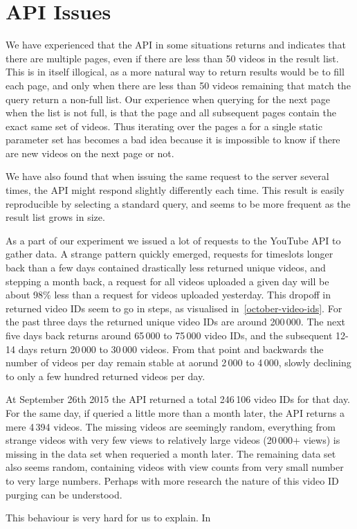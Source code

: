 \section{API Issues}
We have experienced that the API in some situations returns and indicates that
there are multiple pages, even if there are less than 50 videos in the result
list. This is in itself illogical, as a more natural way to return results would
be to fill each page, and only when there are less than 50 videos remaining that
match the query return a non-full list. Our experience when querying for the next
page when the list is not full, is that the page and all subsequent pages contain
the exact same set of videos. Thus iterating over the pages a  for a single
static parameter set has becomes a bad idea because it is impossible to know if
there are new videos on the next page or not.  %

We have also found that when issuing the same request to the server several
times, the API might respond slightly differently each time. This result is
easily reproducible by selecting a standard query, and seems to be more
frequent as the result list grows in size. %

As a part of our experiment we issued a lot of requests to the YouTube API to
gather data. A strange pattern quickly emerged, requests for timeslots longer
back than a few days contained drastically less returned unique videos, and 
stepping a month back, a request for all videos uploaded a given day will be 
about 98\% less than a request for videos uploaded yesterday. This dropoff in
returned video IDs seem to go in steps, as visualised
in~\cref{october-video-ids}. For the past three days the returned unique video
IDs are around 200\,000. The next five days back returns around 65\,000 to 75\,000
video IDs, and the subsequent 12-14 days return 20\,000 to 30\,000 videos. From
that point and backwards the number of videos per day remain stable at aorund
2\,000 to 4\,000, slowly declining to only a few hundred returned videos per day.

At September 26th 2015 the API returned a total 246\,106 video IDs for that day.
For the same day, if queried a little more than a month later, the API returns
a mere 4\,394 videos. The missing videos are seemingly random, everything from 
strange videos with very few views to relatively large videos (20\,000+ views)
is missing in the data set when requeried a month later. The remaining data set
also seems random, containing videos with view counts from very small number to
very large numbers. Perhaps with more research the nature of this video ID
purging can be understood.

This behaviour is very hard for us to explain. In 


